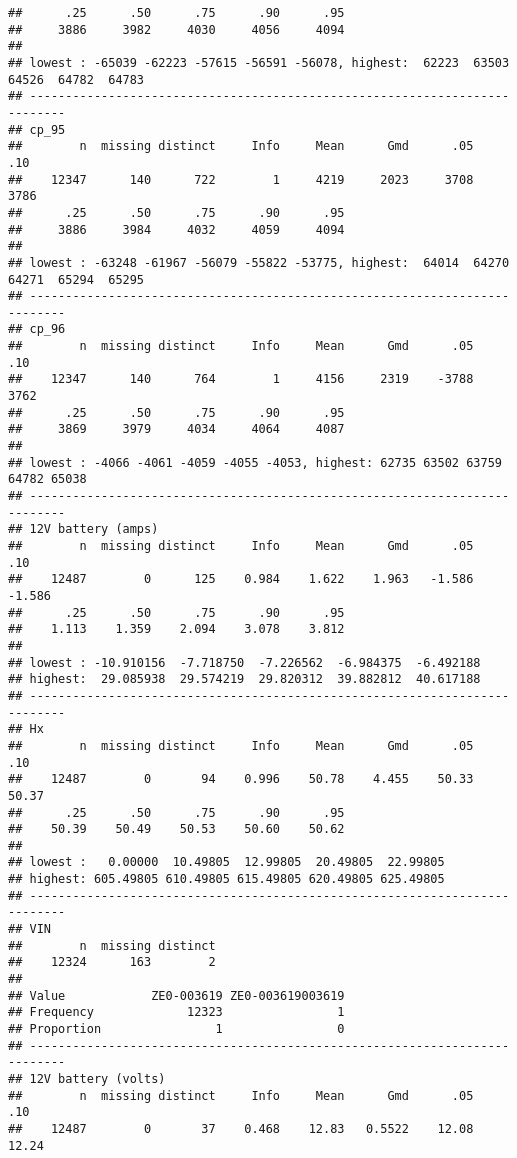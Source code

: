 \documentclass[]{article}
\begin{document}
\begin{verbatim}
##      .25      .50      .75      .90      .95 
##     3886     3982     4030     4056     4094 
## 
## lowest : -65039 -62223 -57615 -56591 -56078, highest:  62223  63503  64526  64782  64783
## ---------------------------------------------------------------------------
## cp_95 
##        n  missing distinct     Info     Mean      Gmd      .05      .10 
##    12347      140      722        1     4219     2023     3708     3786 
##      .25      .50      .75      .90      .95 
##     3886     3984     4032     4059     4094 
## 
## lowest : -63248 -61967 -56079 -55822 -53775, highest:  64014  64270  64271  65294  65295
## ---------------------------------------------------------------------------
## cp_96 
##        n  missing distinct     Info     Mean      Gmd      .05      .10 
##    12347      140      764        1     4156     2319    -3788     3762 
##      .25      .50      .75      .90      .95 
##     3869     3979     4034     4064     4087 
## 
## lowest : -4066 -4061 -4059 -4055 -4053, highest: 62735 63502 63759 64782 65038
## ---------------------------------------------------------------------------
## 12V battery (amps) 
##        n  missing distinct     Info     Mean      Gmd      .05      .10 
##    12487        0      125    0.984    1.622    1.963   -1.586   -1.586 
##      .25      .50      .75      .90      .95 
##    1.113    1.359    2.094    3.078    3.812 
## 
## lowest : -10.910156  -7.718750  -7.226562  -6.984375  -6.492188
## highest:  29.085938  29.574219  29.820312  39.882812  40.617188
## ---------------------------------------------------------------------------
## Hx 
##        n  missing distinct     Info     Mean      Gmd      .05      .10 
##    12487        0       94    0.996    50.78    4.455    50.33    50.37 
##      .25      .50      .75      .90      .95 
##    50.39    50.49    50.53    50.60    50.62 
## 
## lowest :   0.00000  10.49805  12.99805  20.49805  22.99805
## highest: 605.49805 610.49805 615.49805 620.49805 625.49805
## ---------------------------------------------------------------------------
## VIN 
##        n  missing distinct 
##    12324      163        2 
##                                             
## Value            ZE0-003619 ZE0-003619003619
## Frequency             12323                1
## Proportion                1                0
## ---------------------------------------------------------------------------
## 12V battery (volts) 
##        n  missing distinct     Info     Mean      Gmd      .05      .10 
##    12487        0       37    0.468    12.83   0.5522    12.08    12.24 

\end{verbatim}
\end{document}

